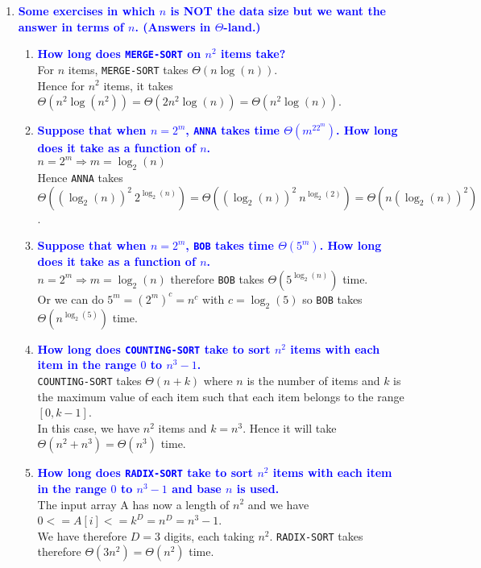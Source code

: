 \documentclass[11pt]{article}
\begin{document}
\begin{enumerate}
\item \textbf{\textcolor{blue}{Some exercises in which $n$ is NOT the data size but we want
the answer in terms of $n$. (Answers in $\Theta$-land.)}}
    \begin{enumerate}
    \item \textbf{\textcolor{blue}{How long does {\tt MERGE-SORT} on $n^2$ items take?}}
        \\ For $n$ items, {\tt MERGE-SORT} takes $\Theta(n\log(n))$.
        \\ Hence for $n^2$ items, it takes $\Theta(n^2 \log(n^2)) = \Theta(2n^2 \log(n)) = \Theta(n^2 \log(n))$.
    \item \textbf{\textcolor{blue}{Suppose that when $n=2^m$, {\tt ANNA} takes time $\Theta(m^22^m)$.
    How long does it take as a function of $n$.}}
        \\ $n=2^m \Rightarrow m=\log_2(n)$
        \\ Hence {\tt ANNA} takes $\Theta((\log_2(n))^2\ 2^{\log_2(n)}) = \Theta((\log_2(n))^2\ n^{\log_2(2)}) = \Theta(n(\log_2(n))^2)$.
    \item \textbf{\textcolor{blue}{Suppose that when $n=2^m$, {\tt BOB} takes time $\Theta(5^m)$.
    How long does it take as a function of $n$.}}
        \\ $n=2^m \Rightarrow m=\log_2(n)$ therefore {\tt BOB} takes $\Theta(5^{\log_2(n)})$ time.
        \\ Or we can do $5^m = (2^{m})^c = n^c$ with $c = \log_2(5)$ so {\tt BOB} takes $\Theta(n^{\log_2(5)})$ time.
    \item \textbf{\textcolor{blue}{How long does {\tt COUNTING-SORT} take to sort $n^2$ items with
    each item in the range $0$ to $n^3-1$.}}
        \\ {\tt COUNTING-SORT} takes $\Theta(n+k)$ where $n$ is the number of items and $k$ is the maximum value of each item such that each item belongs to the range $[0, k-1]$.
        \\ In this case, we have $n^2$ items and $k = n^3$. Hence it will take $\Theta(n^2 + n^3) = \Theta(n^3)$ time.
    \item \textbf{\textcolor{blue}{How long does {\tt RADIX-SORT} take to sort $n^2$ items with
    each item in the range $0$ to $n^3-1$ and base $n$ is used.}}
        \\ The input array A has now a length of $n^2$ and we have $0 <= A[i] <= k^D = n^D = n^3 - 1$.
        \\ We have therefore $D = 3$ digits, each taking $n^2$. {\tt RADIX-SORT} takes therefore $\Theta(3n^2) = \Theta(n^2)$ time.

\end{enumerate}
\end{enumerate}
\end{document}
